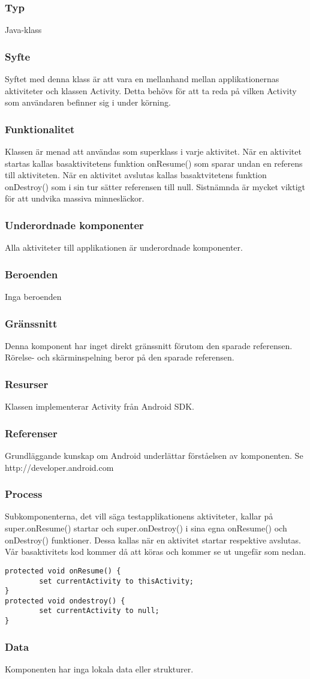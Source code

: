 \subsubsection{Typ}
Java-klass
\subsubsection{Syfte}
Syftet med denna klass är att vara en mellanhand mellan applikationernas aktiviteter och klassen Activity. Detta behövs för att ta reda på vilken Activity som användaren befinner sig i under körning.
\subsubsection{Funktionalitet}
Klassen är menad att användas som superklass i varje aktivitet. När en aktivitet startas kallas basaktivitetens funktion onResume() som sparar undan en referens till aktiviteten. När en aktivitet avslutas kallas basaktvitetens funktion onDestroy() som i sin tur sätter referensen till null. Sistnämnda är mycket viktigt för att undvika massiva minnesläckor.
\subsubsection{Underordnade komponenter}
Alla aktiviteter till applikationen är underordnade komponenter. 
\subsubsection{Beroenden}
Inga beroenden
\subsubsection{Gränssnitt}
Denna komponent har inget direkt gränssnitt förutom den sparade referensen. Rörelse- och skärminspelning beror på den sparade referensen.
\subsubsection{Resurser}
Klassen implementerar Activity från Android SDK.
\subsubsection{Referenser}
Grundläggande kunskap om Android underlättar förståelsen av komponenten. Se http://developer.android.com
\subsubsection{Process}
Subkomponenterna, det vill säga testapplikationens aktiviteter, kallar på super.onResume() startar och super.onDestroy() i sina egna onResume() och onDestroy() funktioner. Dessa kallas när en aktivitet startar respektive avslutas. Vår basaktivitets kod kommer då att köras och kommer se ut ungefär som nedan.
\begin{verbatim}
protected void onResume() {
		set currentActivity to thisActivity;
}
protected void ondestroy() {
		set currentActivity to null;
}
\end{verbatim}
\subsubsection{Data}
 Komponenten har inga lokala data eller strukturer.
